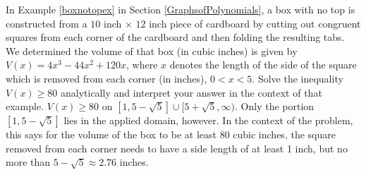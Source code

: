 {In Example \ref{boxnotopex} in Section \ref{GraphsofPolynomials}, a box with no top is constructed from a $10$ inch $\times$ $12$ inch piece of cardboard by cutting out congruent squares from each corner of the cardboard and then folding the resulting tabs.  We determined the volume of that box (in cubic inches) is given by  $V(x) = 4x^3-44x^2+120x$, where $x$ denotes the length of the side of the square which is removed from each corner (in inches), $0 < x < 5$.  Solve the inequality $V(x) \geq 80$ analytically and interpret your answer in the context of that example.}
{$V(x) \geq 80$ on $[1,5-\sqrt{5}] \cup [5+\sqrt{5}, \infty)$.  Only the portion $[1,5-\sqrt{5}]$ lies in the applied domain, however.   In the context of the problem, this says for the volume of the box to be at least 80 cubic inches, the square removed from each corner needs to have a side length of at least 1 inch, but no more than $5-\sqrt{5} \approx 2.76$ inches.
}